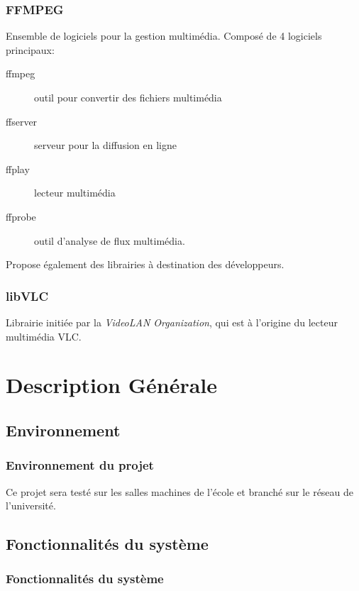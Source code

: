 \documentclass{beamer}
\begin{document}
\begin{frame}	
\frametitle{FFMPEG}


Ensemble de logiciels pour la gestion multimédia. Composé de 4 logiciels principaux: 

\begin{description}
	\item[ffmpeg] outil pour convertir des fichiers multimédia
	\item[ffserver] serveur pour la diffusion en ligne
	\item[ffplay] lecteur multimédia
	\item[ffprobe] outil d'analyse de flux multimédia.
\end{description}


Propose également des librairies à destination des développeurs.

\end{frame}

\begin{frame}	
\frametitle{libVLC}


Librairie initiée par la \textit{VideoLAN Organization}, qui est à l'origine du lecteur multimédia VLC.


\end{frame}


\section{Description Générale}

\subsection{Environnement}

\begin{frame}
\frametitle{Environnement du projet}

Ce projet sera testé sur les salles machines de l'école et branché sur le réseau de l'université.


\end{frame}


\subsection{Fonctionnalités du système}

\begin{frame}	
\frametitle{Fonctionnalités du système}
	
	
\end{frame}
\end{document}

